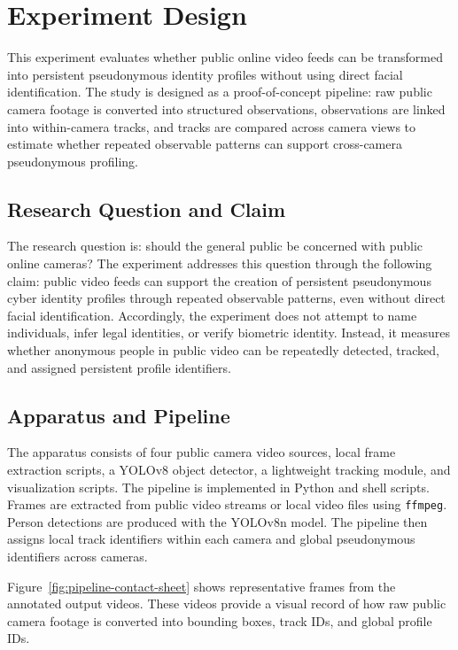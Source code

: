 \section{Experiment Design}
\label{sec:experiment-design}

This experiment evaluates whether public online video feeds can be transformed
into persistent pseudonymous identity profiles without using direct facial
identification. The study is designed as a proof-of-concept pipeline: raw public
camera footage is converted into structured observations, observations are
linked into within-camera tracks, and tracks are compared across camera views to
estimate whether repeated observable patterns can support cross-camera
pseudonymous profiling.

\subsection{Research Question and Claim}
\label{subsec:research-question}

The research question is: should the general public be concerned with public
online cameras? The experiment addresses this question through the following
claim: public video feeds can support the creation of persistent pseudonymous
cyber identity profiles through repeated observable patterns, even without
direct facial identification. Accordingly, the experiment does not attempt to
name individuals, infer legal identities, or verify biometric identity. Instead,
it measures whether anonymous people in public video can be repeatedly detected,
tracked, and assigned persistent profile identifiers.

\subsection{Apparatus and Pipeline}
\label{subsec:apparatus-pipeline}

The apparatus consists of four public camera video sources, local frame
extraction scripts, a YOLOv8 object detector, a lightweight tracking module, and
visualization scripts. The pipeline is implemented in Python and shell scripts.
Frames are extracted from public video streams or local video files using
\texttt{ffmpeg}. Person detections are produced with the YOLOv8n model. The
pipeline then assigns local track identifiers within each camera and global
pseudonymous identifiers across cameras.

Figure~\ref{fig:pipeline-contact-sheet} shows representative frames from the
annotated output videos. These videos provide a visual record of how raw public
camera footage is converted into bounding boxes, track IDs, and global profile
IDs.

